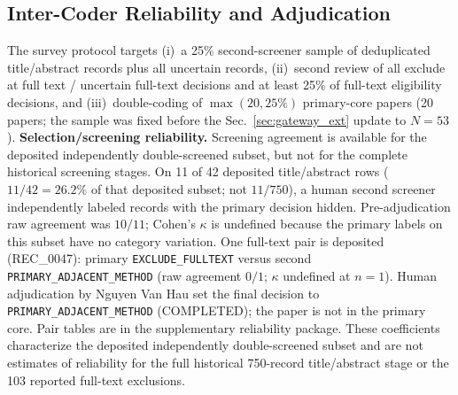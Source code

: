 \documentclass[lettersize,journal]{IEEEtran}
\begin{document}
\subsection{Inter-Coder Reliability and Adjudication}
\label{sec:icr}
The survey protocol targets (i)~a 25\% second-screener sample of deduplicated title/abstract records plus all uncertain records, (ii)~second review of all exclude at full text / uncertain full-text decisions and at least 25\% of full-text eligibility decisions, and (iii)~double-coding of $\max(20, 25\%)$ primary-core papers (20 papers; the sample was fixed before the Sec.~\ref{sec:gateway_ext} update to $N=53$).
\textbf{Selection/screening reliability.} Screening agreement is available for the deposited independently double-screened subset, but not for the complete historical screening stages. On 11 of 42 deposited title/abstract rows ($11/42=26.2\%$ of that deposited subset; not $11/750$), a human second screener independently labeled records with the primary decision hidden. Pre-adjudication raw agreement was $10/11$; Cohen's $\kappa$ is undefined because the primary labels on this subset have no category variation. One full-text pair is deposited (REC\_0047): primary \texttt{EXCLUDE\_FULLTEXT} versus second \texttt{PRIMARY\_ADJACENT\_METHOD} (raw agreement $0/1$; $\kappa$ undefined at $n=1$). Human adjudication by Nguyen Van Hau set the final decision to \texttt{PRIMARY\_ADJACENT\_METHOD} (COMPLETED); the paper is not in the primary core. Pair tables are in the supplementary reliability package. These coefficients characterize the deposited independently double-screened subset and are not estimates of reliability for the full historical 750-record title/abstract stage or the 103 reported full-text exclusions.
\end{document}
